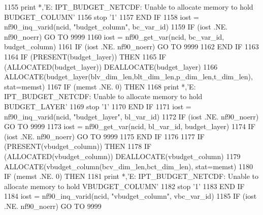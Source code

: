\begin{DoxyCode}
1155             print *,\textcolor{stringliteral}{'E: IPT\_BUDGET\_NETCDF: Unable to allocate memory to hold BUDGET\_COLUMN'}
1156             stop \textcolor{stringliteral}{'1'}
1157 \textcolor{keywordflow}{        END IF}
1158         iost = nf90\_inq\_varid(ncid, \textcolor{stringliteral}{"budget\_column"}, bc\_var\_id)
1159         \textcolor{keywordflow}{IF} (iost .NE. nf90\_noerr) \textcolor{keywordflow}{GO TO} 9999
1160         iost = nf90\_get\_var(ncid, bc\_var\_id, budget\_column)
1161         \textcolor{keywordflow}{IF} (iost .NE. nf90\_noerr) \textcolor{keywordflow}{GO TO} 9999
1162 \textcolor{keywordflow}{    END IF}
1163 
1164     \textcolor{keywordflow}{IF} (\textcolor{keyword}{PRESENT}(budget\_layer)) \textcolor{keywordflow}{THEN}
1165         \textcolor{keywordflow}{IF} (\textcolor{keyword}{ALLOCATED}(budget\_layer))          \textcolor{keyword}{DEALLOCATE}(budget\_layer)
1166         \textcolor{keyword}{ALLOCATE}(budget\_layer(blv\_dim\_len,blt\_dim\_len,p\_dim\_len,t\_dim\_len), stat=memst)
1167         \textcolor{keywordflow}{IF} (memst .NE. 0) \textcolor{keywordflow}{THEN}
1168             print *,\textcolor{stringliteral}{'E: IPT\_BUDGET\_NETCDF: Unable to allocate memory to hold BUDGET\_LAYER'}
1169             stop \textcolor{stringliteral}{'1'}
1170 \textcolor{keywordflow}{        END IF}
1171         iost = nf90\_inq\_varid(ncid, \textcolor{stringliteral}{"budget\_layer"}, bl\_var\_id)
1172         \textcolor{keywordflow}{IF} (iost .NE. nf90\_noerr) \textcolor{keywordflow}{GO TO} 9999
1173         iost = nf90\_get\_var(ncid, bl\_var\_id, budget\_layer)
1174         \textcolor{keywordflow}{IF} (iost .NE. nf90\_noerr) \textcolor{keywordflow}{GO TO} 9999
1175 \textcolor{keywordflow}{    END IF}
1176 
1177     \textcolor{keywordflow}{IF} (\textcolor{keyword}{PRESENT}(vbudget\_column)) \textcolor{keywordflow}{THEN}
1178         \textcolor{keywordflow}{IF} (\textcolor{keyword}{ALLOCATED}(vbudget\_column))          \textcolor{keyword}{DEALLOCATE}(vbudget\_column)
1179         \textcolor{keyword}{ALLOCATE}(vbudget\_column(bcv\_dim\_len,bct\_dim\_len), stat=memst)
1180         \textcolor{keywordflow}{IF} (memst .NE. 0) \textcolor{keywordflow}{THEN}
1181             print *,\textcolor{stringliteral}{'E: IPT\_BUDGET\_NETCDF: Unable to allocate memory to hold VBUDGET\_COLUMN'}
1182             stop \textcolor{stringliteral}{'1'}
1183 \textcolor{keywordflow}{        END IF}
1184         iost = nf90\_inq\_varid(ncid, \textcolor{stringliteral}{"vbudget\_column"}, vbc\_var\_id)
1185         \textcolor{keywordflow}{IF} (iost .NE. nf90\_noerr) \textcolor{keywordflow}{GO TO} 9999

\end{DoxyCode}
